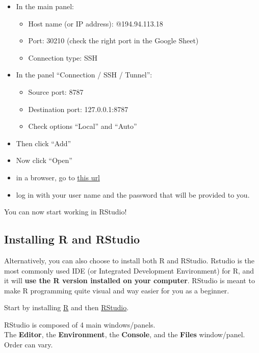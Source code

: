 \documentclass[
]{book}
\providecommand{\tightlist}{%
  \setlength{\itemsep}{0pt}\setlength{\parskip}{0pt}}
\begin{document}
\begin{itemize}
\tightlist
\item
  In the main panel:

  \begin{itemize}
  \tightlist
  \item
    Host name (or IP address): @194.94.113.18
  \item
    Port: 30210 (check the right port in the Google Sheet)
  \item
    Connection type: SSH
  \end{itemize}
\item
  In the panel ``Connection / SSH / Tunnel'':

  \begin{itemize}
  \tightlist
  \item
    Source port: 8787
  \item
    Destination port: 127.0.0.1:8787
  \item
    Check options ``Local'' and ``Auto''
  \end{itemize}
\item
  Then click ``Add''
\item
  Now click ``Open''
\item
  in a browser, go to \href{http://127.0.0.1:8787}{this url}
\item
  log in with your user name and the password that will be provided to you.
\end{itemize}

You can now start working in RStudio!

\hypertarget{installing-r-and-rstudio}{%
\subsection*{Installing R and RStudio}\label{installing-r-and-rstudio}}

Alternatively, you can also choose to install both R and RStudio.
Rstudio is the most commonly used IDE (or Integrated Development Environment) for R, and it will \textbf{use the R version installed on your computer}.
RStudio is meant to make R programming quite visual and way easier for you as a beginner.

Start by installing \href{https://cran.r-project.org/}{R} and then \href{https://posit.co/download/rstudio-desktop/}{RStudio}.

RStudio is composed of 4 main windows/panels.\\
The \textbf{Editor}, the \textbf{Environment}, the \textbf{Console}, and the \textbf{Files} window/panel.
Order can vary.
\end{document}

